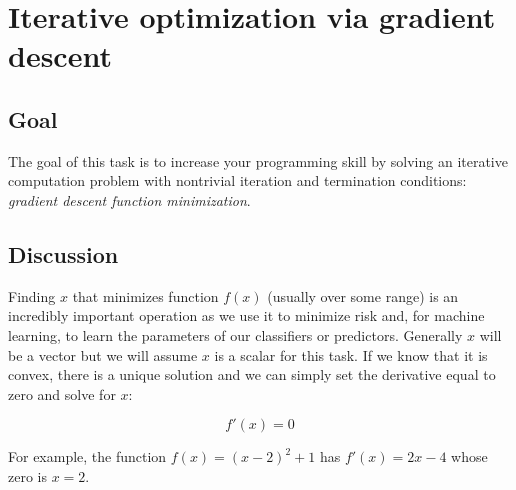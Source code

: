 \chapter{Iterative optimization via gradient descent}

\section{Goal}

\begin{fullwidth}

The goal of this task is to increase your programming skill by solving an iterative computation problem with nontrivial iteration and termination conditions: {\em gradient descent function minimization}.

\section{Discussion}

Finding $x$ that minimizes function $f(x)$ (usually over some range) is an incredibly important operation as we use it to minimize risk and, for machine learning, to learn the parameters of our classifiers or predictors. Generally $x$ will be a vector but we will assume $x$ is a scalar for this task. If we know that it is convex, there is a unique solution and we can simply set the derivative equal to zero and solve for $x$:

\[\tag{Analytic solution to convex optimization}
f'(x) = 0
\]

\noindent For example, the function $f(x) = (x-2)^2 + 1$ has $f'(x) = 2x - 4$ whose zero is $x=2$.



\end{fullwidth}
